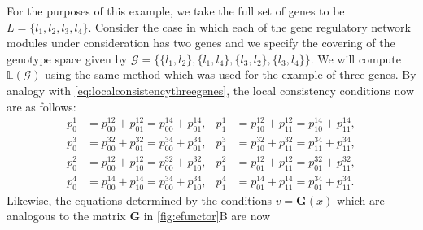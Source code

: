 For the purposes of this example, we take the full set of genes to be $L = \{ l_1,l_2,l_3,l_4 \}$. Consider the case in which each of the gene regulatory network modules under consideration has two genes and we specify the covering of the genotype space given by $\mathcal{G} = \{\{l_1,l_2 \},\{l_1,l_4 \},\{l_3,l_2\},\{l_3,l_4\} \}$.  We will compute $\mathbb{L}(\mathcal{G})$ using the same method which was used for the example of three genes.  By analogy with \ref{eq:localconsistencythreegenes}, the local consistency conditions now are as follows:
\begin{equation}
\begin{aligned}\label{eq:pparsys}
p^1_0 &= p^{12}_{00} + p^{12}_{01} = p^{14}_{00} + p^{14}_{01}, &
p^1_1 &= p^{12}_{10} + p^{12}_{11} = p^{14}_{10} + p^{14}_{11},\\
p^3_0 &= p^{32}_{00} + p^{32}_{01} = p^{34}_{00} + p^{34}_{01},&
p^3_1 &= p^{32}_{10} + p^{32}_{11} = p^{34}_{11} + p^{34}_{11},\\
p^2_0 &= p^{12}_{00} + p^{12}_{10} = p^{32}_{00} + p^{32}_{10},&
p^2_1 &= p^{12}_{01} + p^{12}_{11} = p^{32}_{01} + p^{32}_{11},\\
p^4_0 &= p^{14}_{00} + p^{14}_{10} = p^{34}_{00} + p^{34}_{10},&
p^4_1 &= p^{14}_{01} + p^{14}_{11} = p^{34}_{01} + p^{34}_{11}.
\end{aligned}
\end{equation}
Likewise, the equations determined by the conditions $v = \mathbf{G}(x)$ which are analogous to the matrix $\mathbf{G}$ in \ref{fig:efunctor}B are now
